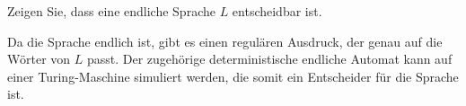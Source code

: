 Zeigen Sie, dass eine endliche Sprache $L$ entscheidbar ist.


\begin{loesung}
Da die Sprache endlich ist, gibt es einen regulären Ausdruck,
der genau auf die Wörter von $L$ passt. Der zugehörige deterministische
endliche Automat kann auf einer Turing-Maschine simuliert werden,
die somit ein Entscheider für die Sprache ist.
\end{loesung}
